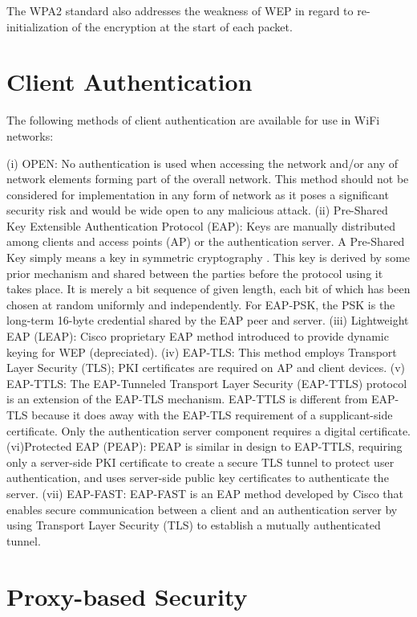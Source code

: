 The WPA2 standard also addresses the weakness of WEP in regard to re-initialization of the encryption at the start of each packet.

\section{Client Authentication}

The following methods of client authentication are available for use in WiFi networks:

(i) OPEN: No authentication is used when accessing the network and/or any of network elements forming part of the overall network. This method should not be considered for implementation in any form of network as it poses a significant security risk and would be wide open to any malicious attack.
(ii) Pre-Shared Key Extensible Authentication Protocol (EAP): Keys are manually distributed among clients and access points (AP) or the authentication server. A Pre-Shared Key simply means a key in symmetric cryptography \cite{EAP_PSK}.  This key is derived by some prior mechanism and shared between the parties before the protocol using it takes place.  It is merely a bit sequence of given length, each bit of which has been chosen at random uniformly and independently.  For EAP-PSK, the PSK is the long-term 16-byte credential shared by the EAP peer and server.
(iii) Lightweight EAP (LEAP): Cisco proprietary EAP method introduced to provide dynamic keying for WEP (depreciated).
(iv) EAP-TLS: This method employs Transport Layer Security (TLS); PKI certificates are required on AP and client devices.
(v) EAP-TTLS: The EAP-Tunneled Transport Layer Security (EAP-TTLS) protocol is an extension of the EAP-TLS mechanism. EAP-TTLS is different from EAP-TLS because it does away with the EAP-TLS requirement of a supplicant-side certificate. Only the authentication server component requires a digital certificate.
(vi)Protected EAP (PEAP): PEAP is similar in design to EAP-TTLS, requiring only a server-side PKI certificate to create a secure TLS tunnel to protect user  authentication, and uses server-side public key certificates to authenticate the server.
(vii) EAP-FAST: EAP-FAST is an EAP method developed by Cisco that enables secure communication between a client and an authentication server by using Transport Layer Security (TLS) to establish a mutually authenticated tunnel.


\section{Proxy-based Security}


